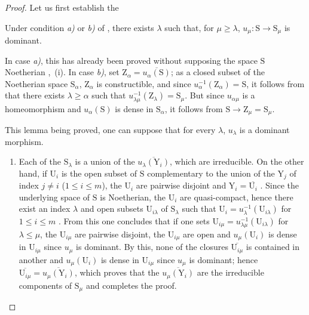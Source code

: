 \begin{proof}
Let us first establish the

\begin{lemma}[8.4.2.1]
\label{IV.8.4.2.1}
Under condition \emph{a)} or \emph{b)} of , there exists $\lambda$ such that, for $\mu\geqslant\lambda$, $u_\mu:\mathrm{S}\to\mathrm{S}_\mu$ is dominant.
\end{lemma}

In case \emph{a)}, this has already been proved without supposing the space $\mathrm{S}$ Noetherian ,~(i).
In case \emph{b)}, set $\mathrm{Z}_\alpha=\overline{u_\alpha(\mathrm{S})}$; as a closed subset of the Noetherian space $\mathrm{S}_\alpha$, $\mathrm{Z}_\alpha$ is constructible, and since $u_\alpha^{-1}(\mathrm{Z}_\alpha)=\mathrm{S}$, it follows from  that there exists $\lambda\geqslant\alpha$ such that $u_{\lambda\mu}^{-1}(\mathrm{Z}_\lambda)=\mathrm{S}_\mu$.
But since $u_{\alpha\mu}$ is a homeomorphism and $u_\alpha(\mathrm{S})$ is dense in $\mathrm{S}_\alpha$, it follows from $\mathrm{S}\to\mathrm{Z}_\mu=\mathrm{S}_\mu$.

This lemma being proved, one can suppose that for every $\lambda$, $u_\lambda$ is a dominant morphism.
\begin{enumerate}[label=(\roman*)]
  \item Each of the $\mathrm{S}_\lambda$ is a union of the $\overline{u_\lambda(\mathrm{Y}_i)}$, which are irreducible.
On the other hand, if $\mathrm{U}_i$ is the open subset of $\mathrm{S}$ complementary to the union of the $\mathrm{Y}_j$ of index $j\neq i$ ($1\leqslant i\leqslant m$), the $\mathrm{U}_i$ are pairwise disjoint and $\mathrm{Y}_i=\overline{\mathrm{U}_i}$ .
Since the underlying space of $\mathrm{S}$ is Noetherian, the $\mathrm{U}_i$ are quasi-compact, hence there exist an index $\lambda$ and open subsets $\mathrm{U}_{i\lambda}$ of $\mathrm{S}_\lambda$ such that $\mathrm{U}_i=u_\lambda^{-1}(\mathrm{U}_{i\lambda})$ for $1\leqslant i\leqslant m$ .
From this one concludes that if one sets $\mathrm{U}_{i\mu}=u_{\lambda\mu}^{-1}(\mathrm{U}_{i\lambda})$ for $\lambda\leqslant\mu$, the $\mathrm{U}_{i\mu}$ are pairwise disjoint, the $\mathrm{U}_{i\mu}$ are open and $u_\mu(\mathrm{U}_i)$ is dense in $\mathrm{U}_{i\mu}$ since $u_\mu$ is dominant.
By this, none of the closures $\overline{\mathrm{U}_{i\mu}}$ is contained in another and $u_\mu(\mathrm{U}_i)$ is dense in $\mathrm{U}_{i\mu}$ since $u_\mu$ is dominant; hence $\overline{\mathrm{U}_{i\mu}}=\overline{u_\mu(\mathrm{Y}_i)}$, which proves that the $\overline{u_\mu(\mathrm{Y}_i)}$ are the irreducible components of $\mathrm{S}_\mu$  and completes the proof.


\end{enumerate}
\end{proof}
